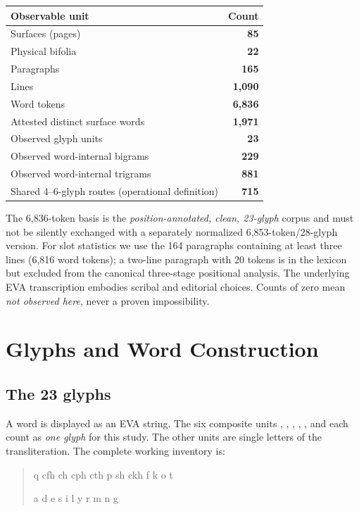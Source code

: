 \documentclass[11pt,a4paper]{article}
\newcommand{\EVA}[1]{{\ttfamily\detokenize{#1}}}
\begin{document}
\begin{center}\begin{tabular}{@{}lr@{}}\toprule
Observable unit & Count \\\midrule
Surfaces (pages) & \textbf{85}\\
Physical bifolia & \textbf{22}\\
Paragraphs & \textbf{165}\\
Lines & \textbf{1,090}\\
Word tokens & \textbf{6,836}\\
Attested distinct surface words & \textbf{1,971}\\
Observed glyph units & \textbf{23}\\
Observed word-internal bigrams & \textbf{229}\\
Observed word-internal trigrams & \textbf{881}\\
Shared 4--6-glyph routes (operational definition) & \textbf{715}\\
\bottomrule\end{tabular}\end{center}

The 6,836-token basis is the \emph{position-annotated, clean, 23-glyph} corpus and must not be silently exchanged with a separately normalized 6,853-token/28-glyph version. For slot statistics we use the 164 paragraphs containing at least three lines (6,816 word tokens); a two-line paragraph with 20 tokens is in the lexicon but excluded from the canonical three-stage positional analysis. The underlying EVA transcription embodies scribal and editorial choices. Counts of zero mean \emph{not observed here}, never a proven impossibility.

\section{Glyphs and Word Construction}
\subsection{The 23 glyphs}
A word is displayed as an EVA string. The six composite units \EVA{cfh}, \EVA{ckh}, \EVA{cph}, \EVA{cth}, \EVA{ch}, and \EVA{sh} each count as \emph{one glyph} for this study. The other units are single letters of the transliteration. The complete working inventory is:

\begin{quote}\ttfamily\small
q  cfh  ch  cph  cth  p  sh  ckh  f  k  o  t\par
a  d  e  s  i  l  y  r  m  n  g
\end{quote}
\end{document}
